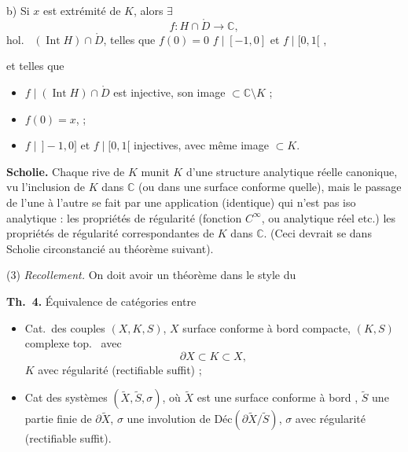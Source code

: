\documentclass[11pt,a4paper]{article}
\begin{document}
b) Si $x$ est extrémité de $K$,  alors $\exists$
\[
  f : H \cap \mathring{D} \to \mathbb{C},
\]
hol.\  $(\operatorname{Int} H) \cap \mathring{D}$,  telles que $f(0) = 0$ \struck{\ill{} $f(\,]-1,0)$ \ill{}}  $f \mid [-1,0]$ et $f \mid [0,1[$ , \ill{}

et telles que
\begin{itemize}
  \item[a)] $f \mid (\operatorname{Int} H) \cap \mathring{D}$ est injective, son image $\subset \mathbb{C} \setminus K$ ;
  \item[b)] $f(0) = x$,  ;
  \item[c)] $f \mid \,]-1,0]$ et $f \mid [0,1[$ injectives, avec même image $\subset K$.
\end{itemize}

\textbf{Scholie.} Chaque rive de $K$  munit $K$ d'une structure analytique réelle canonique, vu l'inclusion de $K$ dans $\mathbb{C}$ (ou dans une surface conforme quelle), mais le passage de l'une à l'autre se fait par une application (identique) qui n'est pas iso analytique : les propriétés de régularité (fonction $C^{\infty}$, ou analytique réel etc.)  \ill{} les propriétés de régularité correspondantes de $K$ dans $\mathbb{C}$. (Ceci devrait se \ill{} dans   Scholie  circonstancié au théorème suivant).

(3) \emph{Recollement.} On doit avoir un théorème dans le style du

\textbf{Th.~4.} Équivalence de catégories entre
\begin{itemize}
  \item[a)] Cat.\ des couples $(X, K, S)$, $X$ surface conforme à bord compacte, $(K, S)$ complexe top.\   avec
  \[
    \partial X \subset K \subset X,
  \]
  $K$ avec régularité (rectifiable suffit) ;
  \item[b)] Cat des systèmes $(\widetilde{X}, \widetilde{S}, \sigma)$, où $\widetilde{X}$ est une surface conforme à bord , $\widetilde{S}$ une partie finie de $\partial \widetilde{X}$, $\sigma$ une involution de $\text{Déc}(\partial \widetilde{X} / \widetilde{S})$, $\sigma$ avec régularité (rectifiable suffit).
\end{itemize}
\end{document}

